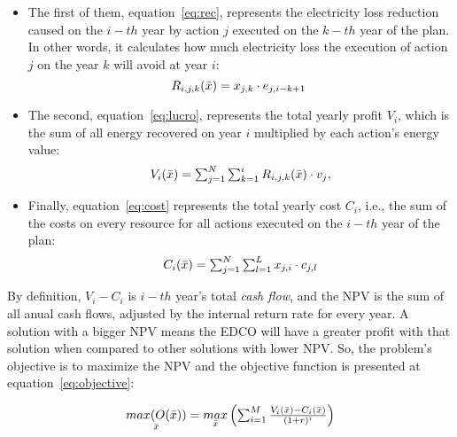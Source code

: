 \begin{itemize}

  \item The first of them, equation~\ref{eq:rec}, represents the electricity loss reduction caused on the $i-th$ year by action $j$ executed on the $k-th$ year of the plan.
        In other words, it calculates how much electricity loss the execution of action $j$ on the year $k$ will avoid at year $i$:
    \begin{equation}
	\label{eq:rec}
        \mymathstyle
	R_{i,j,k}(\bar{x}) = x_{j, k} \cdot e_{j, i - k + 1} \ %
    \end{equation}

  \item The second, equation~\ref{eq:lucro}, represents the total yearly profit $V_i$, which is the sum of all energy recovered on year $i$ multiplied by each action's energy value:
    \begin{equation}
      \label{eq:lucro}
      \mymathstyle
	V_{i}(\bar{x}) = \sum_{j=1}^{N} \sum_{k=1}^{i} R_{i, j, k}(\bar{x}) \cdot v_j,
    \end{equation}
    
  \item Finally, equation~\ref{eq:cost} represents the total yearly cost $C_i$, i.e., the sum of the costs on every resource for all actions executed on the $i-th$ year of the plan:
    \begin{equation}
    \label{eq:cost}
    \mymathstyle
    C_{i}(\bar{x}) =  \sum_{j=1}^{N} \sum_{l=1}^{L} x_{j, i} \cdot c_{j,l}
    \end{equation}
    

\end{itemize}

By definition, $V_i - C_i$ is $i-th$ year's total \textit{cash flow}, and the NPV is the sum of all anual cash flows, 
adjusted by the internal return rate for every year. A solution with a bigger NPV means the EDCO will have a greater profit with that solution when compared
to other solutions with lower NPV. So, the problem's objective is to maximize the NPV and the objective function is presented at equation~\ref{eq:objective}:

\begin{equation}
    \label{eq:objective}
    \mymathstyle
    \underset{\bar{x}}{max(O(\bar{x}))} = \underset{\bar{x}}{max}\left(\sum_{i=1}^{M} \frac{V_i(\bar{x}) - C_i(\bar{x})}{(1 + r)^i}\right)
\end{equation}

